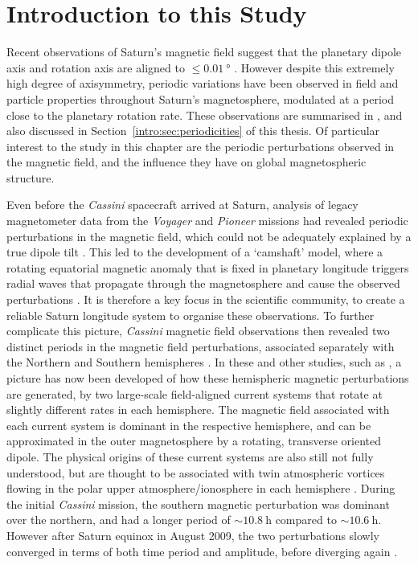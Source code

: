\section{Introduction to this Study}\label{equinox:sec:intro}
Recent observations of Saturn's magnetic field suggest that the planetary dipole axis and rotation axis are aligned to $\leq\SI{0.01}{\degree}$ \citep{dougherty2018}. However despite this extremely high degree of axisymmetry, periodic variations have been observed in field and particle properties throughout Saturn's magnetosphere, modulated at a period close to the planetary rotation rate. These observations are summarised in \citet{carbary2013}, and also discussed in Section~\ref{intro:sec:periodicities} of this thesis. Of particular interest to the study in this chapter are  the periodic perturbations observed in the magnetic field, and the influence  they have on global magnetospheric structure.

Even before the \textit{Cassini} spacecraft arrived at Saturn, analysis of legacy magnetometer data from the \textit{Voyager} and \textit{Pioneer} missions had revealed periodic perturbations in the magnetic field, which could not be adequately explained by a true dipole tilt \citep{espinosa2000}. This led to the development of a `camshaft' model, where a rotating equatorial magnetic anomaly that is fixed in planetary longitude triggers radial waves that propagate through the magnetosphere and cause the observed perturbations \citep{espinosa2003b}. It is therefore a key focus in the scientific community, to create a reliable Saturn longitude system to organise these  observations. To further complicate this picture, \textit{Cassini} magnetic field observations then revealed two distinct periods in the magnetic field perturbations, associated separately with the Northern and Southern hemispheres \citep[e.g.][]{andrews2010,provan2012}. In these and other studies, such as \citet{hunt2014}, a picture has now been developed of how these hemispheric magnetic perturbations are generated, by two large-scale field-aligned current systems that rotate at slightly different rates in each hemisphere. The magnetic field associated with each current system is dominant in the respective hemisphere, and can be approximated in the outer magnetosphere by a rotating, transverse oriented dipole. The physical origins of these current systems are also still not fully understood, but are thought to be associated with twin atmospheric vortices flowing in the polar upper atmosphere/ionosphere in each hemisphere \citep{jiaandkivelson2012, southwood2014, smith2016}. During the initial \textit{Cassini} mission, the southern magnetic perturbation was dominant over the northern, and had a longer period of ${\sim}\SI{10.8}{\hour}$ compared to ${\sim}\SI{10.6}{\hour}$. However after Saturn equinox in August 2009, the two perturbations slowly converged in terms of both time period and amplitude, before diverging again \citep{andrews2012}.

